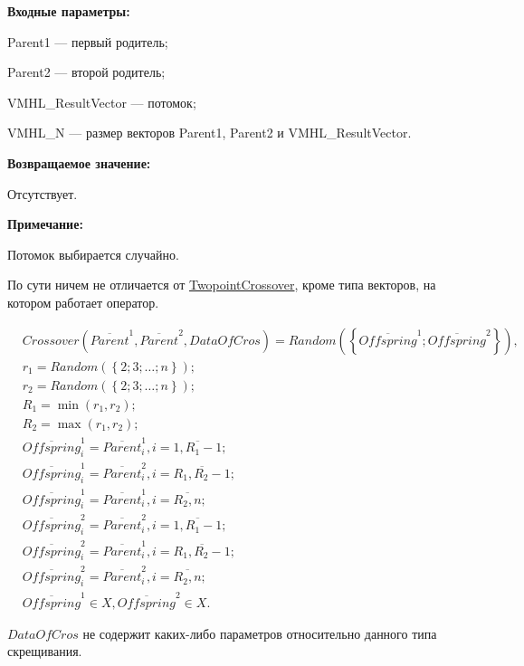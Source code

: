 \textbf{Входные параметры:}
 
 Parent1 --- первый родитель;
 
 Parent2 --- второй родитель;
 
 VMHL\_ResultVector --- потомок;
 
 VMHL\_N --- размер векторов Parent1, Parent2 и VMHL\_ResultVector.

\textbf{Возвращаемое значение:}

 Отсутствует.
 
\textbf{ Примечание:}

 Потомок выбирается случайно.
 
По сути ничем не отличается от \hyperref[SetOfOperatorsAlgorithms:TwopointCrossover]{TwopointCrossover}, кроме типа векторов, на котором работает оператор.
 
\begin{align}
&Crossover \left( \overline{Parent}^1, \overline{Parent}^2, DataOfCros\right)=Random \left(\left\lbrace \overline{Offspring}^1; \overline{Offspring}^2\right\rbrace  \right),\nonumber \\
&r_1=Random\left( \left\lbrace 2; 3; \ldots; n\right\rbrace \right); \nonumber \\
&r_2=Random\left( \left\lbrace 2; 3; \ldots; n\right\rbrace \right); \nonumber \\
&R_1=\min \left( r_1, r_2\right) ; \nonumber \\
&R_2=\max \left( r_1, r_2\right) ; \nonumber \\
& \overline{Offspring}^1_i=\overline{Parent}^1_i, i=\overline{1,R_1-1};\nonumber\\
& \overline{Offspring}^1_i=\overline{Parent}^2_i, i=\overline{R_1,R_2-1};\nonumber\\
&  \overline{Offspring}^1_i=\overline{Parent}^1_i, i=\overline{R_2,n};\nonumber\\
& \overline{Offspring}^2_i=\overline{Parent}^2_i, i=\overline{1,R_1-1};\nonumber\\
& \overline{Offspring}^2_i=\overline{Parent}^1_i, i=\overline{R_1,R_2-1};\nonumber\\
&  \overline{Offspring}^2_i=\overline{Parent}^2_i, i=\overline{R_2,n};\nonumber\\
&\overline{Offspring}^1\in X, \overline{Offspring}^2\in X.
\end{align}

$ DataOfCros $ не содержит каких-либо параметров относительно данного типа скрещивания.